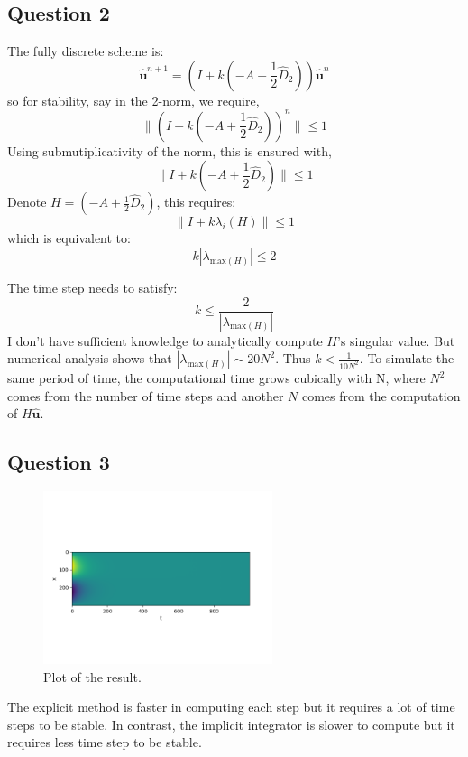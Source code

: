 \documentclass[12pt, fullpage,letterpaper]{article}
\begin{document}
\subsection{Question 2}
The fully discrete scheme is:
\begin{equation}
     \hat{\mathbf{u}}^{n+1} = (I + k( - A + \frac{1}{2} \hat{D}_2 )) \hat{\mathbf{u}}^{n} 
\end{equation}
so for stability, say in the 2-norm, we require,
\begin{equation}
     \| (I + k( - A + \frac{1}{2} \hat{D}_2 ))^n\| \leq 1
\end{equation}
Using submutiplicativity of the norm, this is ensured with,
\begin{equation}
     \| I + k( - A + \frac{1}{2} \hat{D}_2 )\| \leq 1
\end{equation}
Denote $H= ( - A + \frac{1}{2} \hat{D}_2 )$, this requires:
\begin{equation}
     \| I + k\lambda_i(H)\| \leq 1
\end{equation}
which is equivalent to:
\begin{equation}
k |\lambda_{\text{max}(H)}| \leq 2
\end{equation}

The time step needs to satisfy:
\begin{equation}
k \leq \frac{2}{|\lambda_{\text{max}(H)}|}
\end{equation}
I don't have sufficient knowledge to analytically compute $H$'s singular value. But numerical analysis shows that $|\lambda_{\text{max}(H)}| \sim 20 N^2 $.
Thus $k < \frac{1}{10N^2}$.
To simulate the same period of time, the computational time grows cubically with N, where $N^2$ comes from the number of time steps and another $N$ comes from the computation of $H\hat{\mathbf{u}} $.

\subsection{Question 3}
\begin{figure}[H]
    \centering
    \includegraphics[width=0.6\textwidth, trim=0 100 0 100, clip]{Plot_RK23.png}
    \caption{Plot of the result. }
    \label{fig:error}
\end{figure}
The explicit method is faster in computing each step but it requires a lot of time steps to be stable. 
In contrast, the implicit integrator is slower to compute but it requires less time step to be stable.
\end{document}
